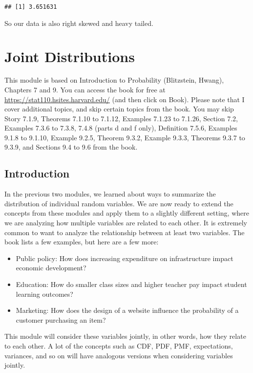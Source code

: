 \documentclass[
]{book}
\providecommand{\tightlist}{%
  \setlength{\itemsep}{0pt}\setlength{\parskip}{0pt}}
\begin{document}
\begin{verbatim}
## [1] 3.651631
\end{verbatim}

So our data is also right skewed and heavy tailed.

\chapter{Joint Distributions}\label{joint-distributions}

This module is based on Introduction to Probability (Blitzstein, Hwang), Chapters 7 and 9. You can access the book for free at \url{https://stat110.hsites.harvard.edu/} (and then click on Book). Please note that I cover additional topics, and skip certain topics from the book. You may skip Story 7.1.9, Theorems 7.1.10 to 7.1.12, Examples 7.1.23 to 7.1.26, Section 7.2, Examples 7.3.6 to 7.3.8, 7.4.8 (parts d and f only), Definition 7.5.6, Examples 9.1.8 to 9.1.10, Example 9.2.5, Theorem 9.3.2, Example 9.3.3, Theorems 9.3.7 to 9.3.9, and Sections 9.4 to 9.6 from the book.

\section{Introduction}\label{introduction-1}

In the previous two modules, we learned about ways to summarize the distribution of individual random variables. We are now ready to extend the concepts from these modules and apply them to a slightly different setting, where we are analyzing how multiple variables are related to each other. It is extremely common to want to analyze the relationship between at least two variables. The book lists a few examples, but here are a few more:

\begin{itemize}
\tightlist
\item
  Public policy: How does increasing expenditure on infrastructure impact economic development?
\item
  Education: How do smaller class sizes and higher teacher pay impact student learning outcomes?
\item
  Marketing: How does the design of a website influence the probability of a customer purchasing an item?
\end{itemize}

This module will consider these variables jointly, in other words, how they relate to each other. A lot of the concepts such as CDF, PDF, PMF, expectations, variances, and so on will have analogous versions when considering variables jointly.
\end{document}
